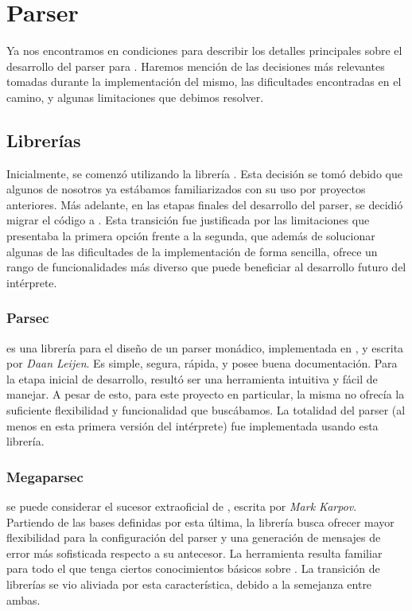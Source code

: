 \section{Parser}

Ya nos encontramos en condiciones para describir los detalles principales sobre el desarrollo del parser para \Lenguaje{}.
Haremos mención de las decisiones más relevantes tomadas durante la implementación del mismo, las dificultades encontradas en el camino, y algunas limitaciones que debimos resolver.

\subsection{Librerías}

Inicialmente, se comenzó utilizando la librería \Parsec{} \cite{Parsec}.
Esta decisión se tomó debido que algunos de nosotros ya estábamos familiarizados con su uso por proyectos anteriores.
Más adelante, en las etapas finales del desarrollo del parser, se decidió migrar el código a \Megaparsec{} \cite{Megaparsec}.
Esta transición fue justificada por las limitaciones que presentaba la primera opción frente a la segunda, que además de solucionar algunas de las dificultades de la implementación de forma sencilla, ofrece un rango de funcionalidades más diverso que puede beneficiar al desarrollo futuro del intérprete.

\subsubsection{Parsec}

\Parsec{} es una librería para el diseño de un parser monádico, implementada en \Haskell{}, y escrita por \textit{Daan Leijen}.
Es simple, segura, rápida, y posee buena documentación.
Para la etapa inicial de desarrollo, resultó ser una herramienta intuitiva y fácil de manejar.
A pesar de esto, para este proyecto en particular, la misma no ofrecía la suficiente flexibilidad y funcionalidad que buscábamos.
La totalidad del parser (al menos en esta primera versión del intérprete) fue implementada usando esta librería.

\subsubsection{Megaparsec}

\Megaparsec{} se puede considerar el sucesor extraoficial de \Parsec{}, escrita por \textit{Mark Karpov}.
Partiendo de las bases definidas por esta última, la librería busca ofrecer mayor flexibilidad para la configuración del parser y una generación de mensajes de error más sofisticada respecto a su antecesor.
La herramienta resulta familiar para todo el que tenga ciertos conocimientos básicos sobre \Parsec{}.
La transición de librerías se vio aliviada por esta característica, debido a la semejanza entre ambas.

